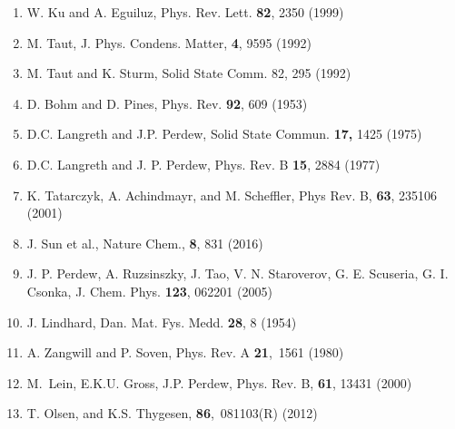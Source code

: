 \documentclass[12pt]{article}
\renewcommand{\_}{\kern-1.5pt\textunderscore\kern-1.5pt}
\begin{document}
\begin{enumerate}
	\item W. Ku and A. Eguiluz, Phys. Rev. Lett. \textbf{82}, 2350 (1999)\par

	\item M. Taut, J. Phys. Condens. Matter, \textbf{4}, 9595 (1992)\par

	\item M. Taut and K. Sturm, Solid State Comm. 82, 295 (1992)\par

	\item D. Bohm and D. Pines, Phys. Rev. \textbf{92}, 609 (1953)\par

	\item D.C. Langreth and J.P. Perdew, Solid State Commun. \textbf{17,} 1425 (1975)\textbf{\  }\par

	\item D.C. Langreth and J. P. Perdew, Phys. Rev. B \textbf{15}, 2884 (1977)\par

	\item K. Tatarczyk, A. Achindmayr, and M. Scheffler, Phys Rev. B, \textbf{63}, 235106 (2001)\par

	\item J. Sun et al., Nature Chem., \textbf{8}, 831 (2016)\par

	\item \textcolor[HTML]{222222}{J. P. Perdew, A. Ruzsinszky, J. Tao, V. N. Staroverov, G. E. Scuseria, G. I. Csonka, J. Chem. Phys. \textbf{123}, 062201 (2005)}\par

	\item \textcolor[HTML]{222222}{J. Lindhard, Dan. Mat. Fys. Medd. \textbf{28}, 8 (1954)}\par

	\item A. Zangwill and P. Soven, Phys. Rev. A \textbf{21},\ 1561  (1980)\par

	\item M.\ Lein, E.K.U. Gross, J.P. Perdew, Phys. Rev. B,  \textbf{61}, 13431 (2000)\par

	\item T. Olsen, and K.S. Thygesen, \textbf{86},\ 081103(R)  (2012)\par


\end{enumerate}
\end{document}
